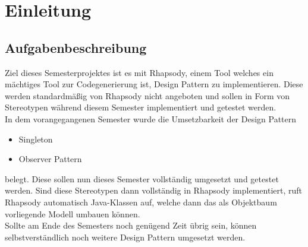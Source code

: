 \chapter{Einleitung}

\section{Aufgabenbeschreibung}

Ziel dieses Semesterprojektes ist es mit Rhapsody, einem Tool welches ein mächtiges Tool zur Codegenerierung ist, Design Pattern zu implementieren. Diese werden standardmäßig von Rhapsody nicht angeboten und sollen in Form von Stereotypen während diesem Semester implementiert und getestet werden.
\\
In dem vorangegangenen Semester wurde die Umsetzbarkeit der Design Pattern
\begin{itemize}
\item Singleton
\item Observer Pattern
\end{itemize}
belegt. Diese sollen nun dieses Semester vollständig umgesetzt und getestet werden. 
Sind diese Stereotypen dann vollständig in Rhapsody implementiert, ruft Rhapsody 
automatisch Java-Klassen auf, welche dann das als Objektbaum vorliegende Modell 
umbauen können.
\\
Sollte am Ende des Semesters noch genügend Zeit übrig sein, können
selbstverständlich noch weitere Design Pattern umgesetzt werden.


